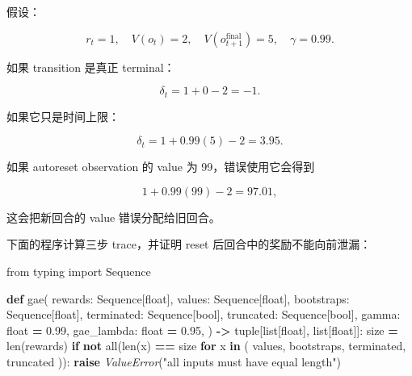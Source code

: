 \documentclass[
  chinese,
  11pt,
  letterpaper,
]{article}
\newenvironment{Shaded}{\begin{snugshade}}{\end{snugshade}}
\newcommand{\BuiltInTok}[1]{#1}
\newcommand{\ControlFlowTok}[1]{\textcolor[rgb]{0.13,0.29,0.53}{\textbf{#1}}}
\newcommand{\FloatTok}[1]{\textcolor[rgb]{0.00,0.00,0.81}{#1}}
\newcommand{\ImportTok}[1]{#1}
\newcommand{\KeywordTok}[1]{\textcolor[rgb]{0.13,0.29,0.53}{\textbf{#1}}}
\newcommand{\NormalTok}[1]{#1}
\newcommand{\OperatorTok}[1]{\textcolor[rgb]{0.81,0.36,0.00}{\textbf{#1}}}
\newcommand{\PreprocessorTok}[1]{\textcolor[rgb]{0.56,0.35,0.01}{\textit{#1}}}
\newcommand{\StringTok}[1]{\textcolor[rgb]{0.31,0.60,0.02}{#1}}
\renewenvironment{Shaded}{\par\smallskip}{\par\smallskip}
\begin{document}
假设：

\[
r_t=1,\quad V(o_t)=2,\quad
V(o_{t+1}^{\mathrm{final}})=5,\quad \gamma=0.99.
\]

如果 transition 是真正 terminal：

\[
\delta_t=1+0-2=-1.
\]

如果它只是时间上限：

\[
\delta_t=1+0.99(5)-2=3.95.
\]

如果 autoreset observation 的 value 为 99，错误使用它会得到

\[
1+0.99(99)-2=97.01,
\]

这会把新回合的 value 错误分配给旧回合。

下面的程序计算三步 trace，并证明 reset 后回合中的奖励不能向前泄漏：

\begin{Shaded}
\begin{Highlighting}[]
\ImportTok{from}\NormalTok{ typing }\ImportTok{import}\NormalTok{ Sequence}


\KeywordTok{def}\NormalTok{ gae(}
\NormalTok{    rewards: Sequence[}\BuiltInTok{float}\NormalTok{],}
\NormalTok{    values: Sequence[}\BuiltInTok{float}\NormalTok{],}
\NormalTok{    bootstraps: Sequence[}\BuiltInTok{float}\NormalTok{],}
\NormalTok{    terminated: Sequence[}\BuiltInTok{bool}\NormalTok{],}
\NormalTok{    truncated: Sequence[}\BuiltInTok{bool}\NormalTok{],}
\NormalTok{    gamma: }\BuiltInTok{float} \OperatorTok{=} \FloatTok{0.99}\NormalTok{,}
\NormalTok{    gae\_lambda: }\BuiltInTok{float} \OperatorTok{=} \FloatTok{0.95}\NormalTok{,}
\NormalTok{) }\OperatorTok{{-}\textgreater{}} \BuiltInTok{tuple}\NormalTok{[}\BuiltInTok{list}\NormalTok{[}\BuiltInTok{float}\NormalTok{], }\BuiltInTok{list}\NormalTok{[}\BuiltInTok{float}\NormalTok{]]:}
\NormalTok{    size }\OperatorTok{=} \BuiltInTok{len}\NormalTok{(rewards)}
    \ControlFlowTok{if} \KeywordTok{not} \BuiltInTok{all}\NormalTok{(}\BuiltInTok{len}\NormalTok{(x) }\OperatorTok{==}\NormalTok{ size }\ControlFlowTok{for}\NormalTok{ x }\KeywordTok{in}\NormalTok{ (}
\NormalTok{        values, bootstraps, terminated, truncated}
\NormalTok{    )):}
        \ControlFlowTok{raise} \PreprocessorTok{ValueError}\NormalTok{(}\StringTok{"all inputs must have equal length"}\NormalTok{)}


\end{Highlighting}
\end{Shaded}
\end{document}
